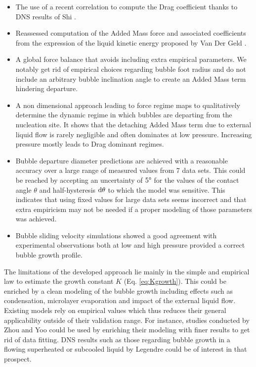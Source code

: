 \begin{itemize}
\item The use of a recent correlation to compute the Drag coefficient thanks to DNS results of Shi \etal \cite{shi_drag_2021}.
\item Reassessed computation of the Added Mass force and associated coefficients from the expression of the liquid kinetic energy proposed by Van Der Geld \cite{van_der_geld_dynamics_2009}. 
\item A global force balance that avoids including extra empirical parameters. We notably get rid of empirical choices regarding bubble foot radius and do not include an arbitrary bubble inclination angle to create an Added Mass term hindering departure.
\item A non dimensional approach leading to force regime maps to qualitatively determine the dynamic regime in which bubbles are departing from the nucleation site. It shows that the detaching Added Mass term due to external liquid flow is rarely negligible and often dominates at low pressure. Increasing pressure mostly leads to Drag dominant regimes.
\item Bubble departure diameter predictions are achieved with a reasonable accuracy over a large range of measured values from 7 data sets. This could be reached by accepting an uncertainty of $5 \degree$ for the values of the contact angle $\theta$ and half-hysteresis $\mathrm{d}\theta$ to which the model was sensitive. This indicates that using fixed values for large data sets seems incorrect and that extra empiricism may not be needed if a proper modeling of those parameters was achieved.
\item Bubble sliding velocity simulations showed a good agreement with experimental observations both at low and high pressure provided a correct bubble growth profile.
\end{itemize}


The limitations of the developed approach lie mainly in the simple and empirical law to estimate the growth constant $K$ (Eq. \ref{eq:Kgrowth}). This could be enriched by a clean modeling of the bubble growth including effects such as condensation, microlayer evaporation and impact of the external liquid flow. Existing models rely on empirical values which thus reduces their general applicability outside of their validation range. For instance, studies conducted by Zhou \cite{zhou_experimental_2020} and Yoo \cite{yoo_development_2018} could be used by enriching their modeling with finer results to get rid of data fitting. DNS results such as those regarding bubble growth in a flowing superheated or subcooled liquid by Legendre \etal \cite{legendre_thermal_1998} could be of interest in that prospect.


